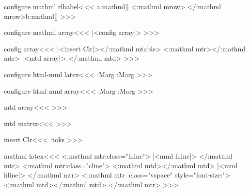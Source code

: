 {{{{{{\<configure mathml rlbabel\><<<
\Configure{[]}
  {\csname a:mathml[]\endcsname
   \DviMath\Tg<\a:mathml mrow\Hnewline>$$\DisplayMathtrue }
  {$$\Tg</\a:mathml mrow>\EndDviMath\csname b:mathml[]\endcsname
   \if@rl\else\beginR\fi }
>>>





\<configure mathml array\><<<
|<config array|>
>>>

\<config array\><<<
   {}
   {\ifvmode \IgnorePar\fi |<insert Clr|>\Tg</\a:mathml mtable>}
   {\Tg<\a:mathml mtr>}{\Tg</\a:mathml mtr>}
   {|<mtd array|>}
   {\Tg</\a:mathml mtd>}
   {\bgroup\Configure{$}{}{}{}} 
   {\egroup}
   {}{}
>>>




\<configure html-mml latex\><<<
   {\PushStack\Col:Marg\AllColMargins
    \bgroup\Configure{$}{}{}{}} 
   {\egroup \PopStack\Col:Marg\AllColMargins}
   {}{}
>>>

\<configure html-mml array\><<<
   {\PushStack\Col:Marg\AllColMargins
    \bgroup\Configure{$}{}{}{}} 
   {\egroup \PopStack\Col:Marg\AllColMargins}
   {}{}
>>>




\<mtd array\><<<
%
   \halignTD    \HCode{>}%
>>>

\<mtd matrix\><<<
%
   \halignTD    \HCode{>}%
>>>




\<insert Clr\><<<
\expandafter\tmp:toks\expandafter{\Clr}%
%
>>>





\<mathml latex\><<<
\def\:MM{m}
   {<\a:mathml mtr\Hnewline \mml:class="hline">} 
   {|<mml hline|>}
   {</\a:mathml mtr>}
   {<\a:mathml mtr\Hnewline \mml:class="cline">}
   {<\a:mathml mtd></\a:mathml mtd>}
   {|<mml hline|>}
   {</\a:mathml mtr>}
   {<\a:mathml mtr\Hnewline
         \mml:class="vspace" style="font-size:\HBorderspace">}
   {<\a:mathml mtd\Hnewline></\a:mathml mtd>}
   {</\a:mathml mtr>}
>>>

}}}}}}
